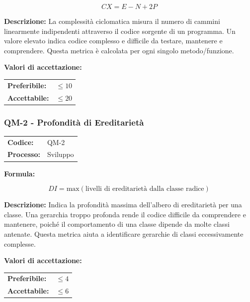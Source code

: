 \documentclass[a4paper,11pt,oneside]{scrartcl}
\begin{document}
\[
    CX = E - N + 2P
\]

\noindent\textbf{Descrizione:} La complessità ciclomatica misura il numero di cammini linearmente indipendenti attraverso il codice sorgente di un programma. Un valore elevato indica codice complesso e difficile da testare, mantenere e comprendere. Questa metrica è calcolata per ogni singolo metodo/funzione.

\vspace{0.2cm}
\noindent\textbf{Valori di accettazione:}
\vspace{0.1cm}

\noindent
\begin{tabular}{@{}ll@{}}
    \textbf{Preferibile:} & $\le 10$ \\
    \textbf{Accettabile:} & $\le 20$ \\
\end{tabular}

\subsubsection{QM-2 - Profondità di Ereditarietà}

\noindent
\begin{tabular}{@{}p{}p{}@{}}
    \textbf{Codice:}   & QM-2     \\
    \textbf{Processo:} & Sviluppo \\
\end{tabular}

\vspace{0.3cm}
\noindent\textbf{Formula:}

\[
    DI = \text{max}(\text{livelli di ereditarietà dalla classe radice})
\]

\noindent\textbf{Descrizione:} Indica la profondità massima dell'albero di ereditarietà per una classe. Una gerarchia troppo profonda rende il codice difficile da comprendere e mantenere, poiché il comportamento di una classe dipende da molte classi antenate. Questa metrica aiuta a identificare gerarchie di classi eccessivamente complesse.

\vspace{0.2cm}
\noindent\textbf{Valori di accettazione:}
\vspace{0.1cm}

\noindent
\begin{tabular}{@{}ll@{}}
    \textbf{Preferibile:} & $\le 4$ \\
    \textbf{Accettabile:} & $\le 6$ \\
\end{tabular}
\end{document}
